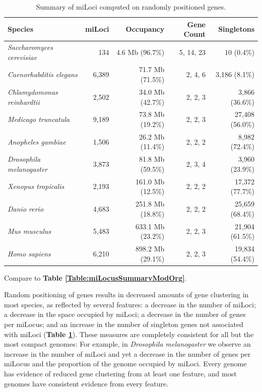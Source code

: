 \begin{table}[t]
\caption{Summary of miLoci computed on randomly positioned genes.}
\label{Table:miLocusSummaryShuffled}
\begin{tabularx}{\textwidth}{lrrrr}
\hline
Species                                &               miLoci &            Occupancy &           Gene Count &           Singletons  \\ \hline
\textit{Saccharomyces cerevisiae}      &                  134 &      4.6 Mb (96.7\%) &            5, 14, 23 &           10 (0.4\%)  \\
\textit{Caenorhabditis elegans}        &                6,389 &     71.7 Mb (71.5\%) &              2, 4, 6 &        3,186 (8.1\%)  \\
\textit{Chlamydomonas reinhardtii}     &                2,502 &     34.0 Mb (42.7\%) &              2, 2, 3 &       3,866 (36.6\%)  \\
\textit{Medicago truncatula}           &                9,189 &     73.8 Mb (19.2\%) &              2, 2, 3 &      27,408 (56.0\%)  \\
\textit{Anopheles gambiae}             &                1,506 &     26.2 Mb (11.4\%) &              2, 2, 2 &       8,982 (72.4\%)  \\
\textit{Drosophila melanogaster}       &                3,873 &     81.8 Mb (59.5\%) &              2, 3, 4 &       3,960 (23.9\%)  \\
\textit{Xenopus tropicalis}            &                2,193 &    161.0 Mb (12.5\%) &              2, 2, 2 &      17,372 (77.7\%)  \\
\textit{Danio rerio}                   &                4,683 &    251.8 Mb (18.8\%) &              2, 2, 2 &      25,659 (68.4\%)  \\
\textit{Mus musculus}                  &                5,483 &    633.1 Mb (23.2\%) &              2, 2, 3 &      21,904 (61.5\%)  \\
\textit{Homo sapiens}                  &                6,210 &    898.2 Mb (29.1\%) &              2, 2, 3 &      19,834 (54.4\%)  \\ \hline
\end{tabularx}
\raggedright
{\scriptsize
Compare to \textbf{Table \ref{Table:miLocusSummaryModOrg}}.
}
\end{table}

Random positioning of genes results in decreased amounts of gene clustering in most species, as reflected by several features: a decrease in the number of miLoci; a decrease in the space occupied by miLoci; a decrease in the number of genes per miLocus; and an increase in the number of singleton genes not associated with miLoci (\textbf{Table \ref{Table:miLocusSummaryShuffled}}).
These measures are completely consistent for all but the most compact genomes:
For example, in \textit{Drosophila melanogaster} we observe an increase in the number of miLoci and yet a decrease in the number of genes per miLocus and the proportion of the genome occupied by miLoci.
Every genome has evidence of reduced gene clustering from at least one feature, and most genomes have consistent evidence from every feature.

